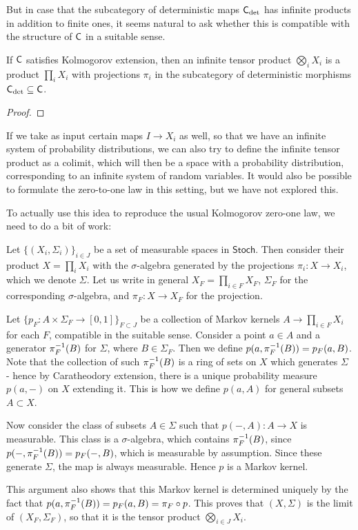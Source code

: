 \documentclass[11pt]{article}
\renewcommand{\sf}{\mathsf}
\begin{document}
But in case that the subcategory of deterministic maps $\mathsf{C}_{\det}$ has infinite products in addition to finite ones, it seems natural to ask whether this is compatible with the structure of $\mathsf{C}$ in a suitable sense.

\begin{lemma}
	If $\mathsf{C}$ satisfies Kolmogorov extension, then an infinite tensor product $\bigotimes_i X_i$ is a product $\prod_i X_i$ with projections $\pi_i$ in the subcategory of deterministic morphisms $\mathsf{C}_{\mathrm{det}} \subseteq \mathsf{C}$.
\end{lemma}

\begin{proof}
\end{proof}

\begin{remark}
    If we take as input certain maps $I \to X_i$ as well, so that we have an infinite system of probability distributions, we can also try to define the infinite tensor product as a colimit, which will then be a space with a probability distribution, corresponding to an infinite system of random variables.
    It would also be possible to formulate the zero-to-one law in this setting, but we have not explored this.
\end{remark}

To actually use this idea to reproduce the usual Kolmogorov zero-one law, we need to do a bit of work:

\begin{example}
Let $\{(X_i,\Sigma_i)\}_{i\in J}$ be a set of measurable spaces in $\sf{Stoch}$.
Then consider their product $X = \prod_i X_i$ with the $\sigma$-algebra generated by the projections $\pi_i: X \to X_i$, which we denote $\Sigma$.
Let us write in general $X_F = \prod_{i\in F}X_F$, $\Sigma_F$ for the corresponding $\sigma$-algebra, and $\pi_F: X \to X_F$ for the projection.

Let $\{p_F: A \times \Sigma_F \to [0,1]\}_{F \subset J}$ be a collection of Markov kernels $A \to \prod_{i \in F}X_i$ for each $F$, compatible in the suitable sense.
Consider a point $a \in A$ and a generator $\pi_F^{-1}(B)$ for $\Sigma$, where $B \in \Sigma_F$.
Then we define $p(a,\pi_F^{-1}(B)) = p_F(a,B)$.
Note that the collection of such $\pi_F^{-1}(B)$ is a ring of sets on $X$ which generates $\Sigma$ - hence by Caratheodory extension, there is a unique probability measure
$p(a,-)$ on $X$ extending it. This is how we define $p(a,A)$ for general subsets $A \subset X$.

Now consider the class of subsets $A \in \Sigma$ such that $p(-,A):A \to X$ is measurable.
This class is a $\sigma$-algebra, which contains $\pi_F^{-1}(B)$, since $p(-,\pi_F^{-1}(B)) = p_F(-,B)$, which is measurable by assumption.
Since these generate $\Sigma$, the map is always measurable.
Hence $p$ is a Markov kernel.

This argument also shows that this Markov kernel is determined uniquely by the fact that $p(a,\pi_F^{-1}(B)) = p_F(a,B) = \pi_F \circ p$.
This proves that $(X,\Sigma)$ is the limit of $(X_F,\Sigma_F)$, so that it is the tensor product $\bigotimes_{i\in J} X_i$.
\end{example}
\end{document}
